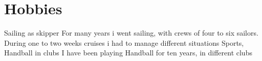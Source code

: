 \documentclass{friggeri-cv}
\begin{document}
\section{Hobbies}
\begin{entrylist}
	\entry  {} {Sailing as skipper} {}
	{
		For many years i went sailing, with crews of four to six sailors. \\
		During one to two weeks cruises i had to manage different situations
	}
	\entry  {} {Sports, Handball in clubs} {} {I have been playing Handball for ten years, in different clubs}
\end{entrylist}
\end{document}
